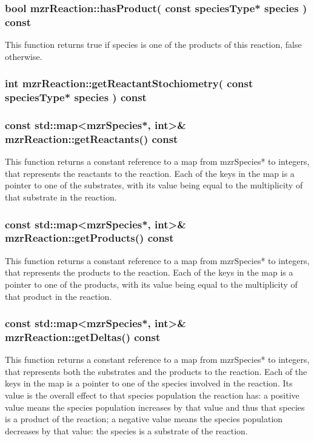 \subsubsection{bool mzrReaction::hasProduct( const speciesType*
  species ) const}
This function returns true if species is one of the products of this
reaction, false otherwise.  

\subsubsection{int mzrReaction::getReactantStochiometry( const
  speciesType* species ) const}

\subsubsection{const std::map<mzrSpecies*, int>\& mzrReaction::getReactants() const}
This function returns a constant reference to a map from mzrSpecies*
to integers, that represents the reactants to the reaction.  Each
of the keys in the map is a pointer to one of the substrates, with its
value being equal to the multiplicity of that substrate in the reaction.

\subsubsection{const std::map<mzrSpecies*, int>\&
  mzrReaction::getProducts() const}
This function returns a constant reference to a map from mzrSpecies*
to integers, that represents the products to the reaction.  Each
of the keys in the map is a pointer to one of the products, with its
value being equal to the multiplicity of that product in the reaction.

\subsubsection{const std::map<mzrSpecies*, int>\&
  mzrReaction::getDeltas() const}
This function returns a constant reference to a map from mzrSpecies*
to integers, that represents both the substrates and the products to the reaction.  Each
of the keys in the map is a pointer to one of the species involved in
the reaction.  Its value is the overall effect to that species
population the reaction has: a positive value means the species
population increases by that value and thus that species is a product
of the reaction; a negative value means the species population
decreases by that value: the species is a substrate of the reaction.

